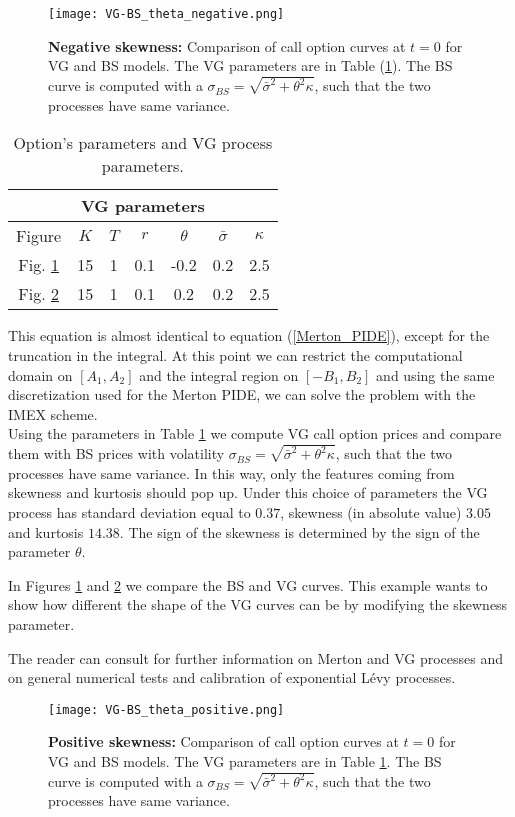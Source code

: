 \begin{figure}[!t]
   \centering
   \texttt{[image: VG-BS\_theta\_negative.png]}
   \caption{\textbf{Negative skewness:} Comparison of call option curves at $t=0$ for VG and BS models. The VG parameters are in Table (\ref{tab:VG}). The BS curve is computed with a 
   $\sigma_{BS} = \sqrt{\bar\sigma^2 + \theta^2 \kappa}$, such that the two processes have same variance.}
   \label{BS_VG} 
 \end{figure}
\begin{table}[h]
  \centering
  \begin{tabular}{ccccccc}
  \toprule
  \multicolumn{7}{c}{VG parameters} \\
  \midrule
  Figure & $K$ & $T$ & $r$ & $\theta$ & $\bar\sigma$ &$\kappa$ \\
  \midrule
  Fig. \ref{BS_VG} & 15 & 1 & 0.1 & -0.2 & 0.2 & 2.5 \\
  Fig. \ref{BS_VG2} & 15 & 1 & 0.1 & 0.2 & 0.2 & 2.5 \\
  \bottomrule
  \end{tabular}
  \caption{Option's parameters and VG process parameters.}
  \label{tab:VG}
\end{table}

This equation is almost identical to equation (\ref{Merton_PIDE}), except for the truncation in the integral. 
At this point we can restrict the computational domain on $[A_1,A_2]$ and the integral region on $[-B_1,B_2]$ and using the same discretization
used for the Merton PIDE, we can solve the problem with the IMEX scheme.\\

Using the parameters in Table \ref{tab:VG} we compute VG call option prices and compare them with BS prices with volatility $\sigma_{BS} = \sqrt{\bar\sigma^2 + \theta^2 \kappa}$, 
such that the two processes have same variance.
In this way, only the features coming from skewness and kurtosis should pop up.
Under this choice of parameters the VG process has standard deviation equal to $0.37$, skewness (in absolute value) $3.05$ and kurtosis $14.38$.
The sign of the skewness is determined by the sign of the parameter $\theta$.

In Figures \ref{BS_VG} and \ref{BS_VG2} we compare the BS and VG curves.
This example wants to show how different the shape of the VG curves can be by modifying the skewness parameter.

The reader can consult \cite{Schoutens} for further information on Merton and VG processes and on general numerical tests and calibration of exponential Lévy processes. 
\begin{figure}[!t]
   \centering
   \texttt{[image: VG-BS\_theta\_positive.png]}
   \caption{\textbf{Positive skewness:} Comparison of call option curves at $t=0$ for VG and BS models. The VG parameters are in Table \ref{tab:VG}. The BS curve is computed with a 
   $\sigma_{BS} = \sqrt{\bar\sigma^2 + \theta^2 \kappa}$, such that the two processes have same variance.}
   \label{BS_VG2} 
\end{figure}



